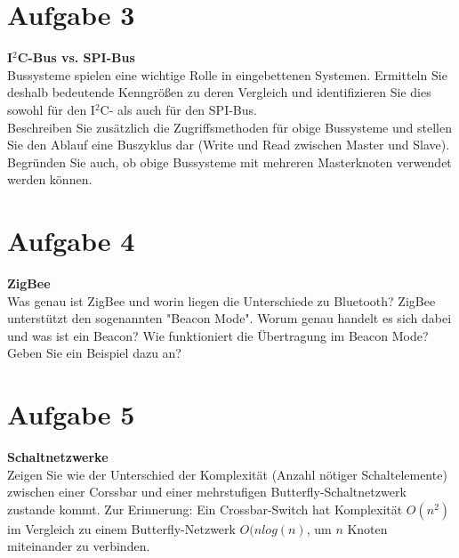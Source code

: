 \documentclass[12pt,a4paper,ngerman]{article}
\begin{document}
\pagebreak

\section*{Aufgabe 3}


\begin{framed}
\textbf{I$^2$C-Bus vs. SPI-Bus}\\
Bussysteme spielen eine wichtige Rolle in eingebettenen Systemen. Ermitteln Sie deshalb bedeutende Kenngrößen zu deren Vergleich und identifizieren Sie dies sowohl für den I$^2$C- als auch für den SPI-Bus. \\
Beschreiben Sie zusätzlich die Zugriffsmethoden für obige Bussysteme und stellen Sie den Ablauf eine Buszyklus dar (Write und Read zwischen Master und Slave). Begründen Sie auch, ob obige Bussysteme mit mehreren Masterknoten verwendet werden können.
\end{framed}

\pagebreak

\section*{Aufgabe 4}


\begin{framed}
\textbf{ZigBee}\\
Was genau ist ZigBee und worin liegen die Unterschiede zu Bluetooth? ZigBee unterstützt den sogenannten "Beacon Mode". Worum genau handelt es sich dabei und was ist ein Beacon? Wie funktioniert die Übertragung im Beacon Mode? Geben Sie ein Beispiel dazu an?
\end{framed}

\pagebreak

\section*{Aufgabe 5}


\begin{framed}
\textbf{Schaltnetzwerke}\\
Zeigen Sie wie der Unterschied der Komplexität (Anzahl nötiger Schaltelemente) zwischen einer Corssbar und einer mehrstufigen Butterfly-Schaltnetzwerk zustande kommt.
Zur Erinnerung: Ein Crossbar-Switch hat Komplexität $O(n^2)$ im Vergleich zu einem Butterfly-Netzwerk $O(nlog(n)$, um $n$ Knoten miteinander zu verbinden. 
\end{framed}

\pagebreak
\end{document}
